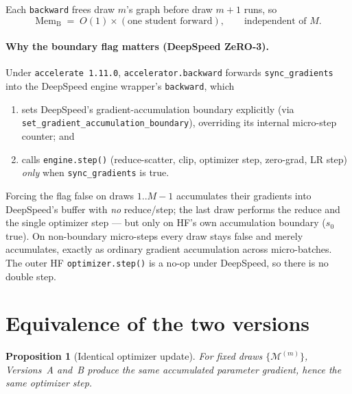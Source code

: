 \documentclass{article}
\newcommand{\Mset}{\mathcal M}
\theoremstyle{plain}
\newtheorem{proposition}{Proposition}
\theoremstyle{remark}
\begin{document}
Each \texttt{backward} frees draw $m$'s graph before draw $m{+}1$ runs, so
\begin{equation}
  \text{Mem}_{\text{B}} \;=\; O(1)\times(\text{one student forward}),
  \qquad\text{independent of } M.
\end{equation}

\paragraph{Why the boundary flag matters (DeepSpeed ZeRO-3).}
Under \texttt{accelerate 1.11.0}, \texttt{accelerator.backward} forwards
\texttt{sync\_gradients} into the DeepSpeed engine wrapper's \texttt{backward},
which
\begin{enumerate}\itemsep2pt
  \item sets DeepSpeed's gradient-accumulation boundary explicitly
        (via \texttt{set\_gradient\_}\allowbreak\texttt{accumulation\_}\allowbreak\texttt{boundary}),
        overriding its internal micro-step counter; and
  \item calls \texttt{engine.step()} (reduce-scatter, clip, optimizer step, zero-grad,
        LR step) \emph{only} when \texttt{sync\_gradients} is true.
\end{enumerate}
Forcing the flag false on draws $1..M{-}1$ accumulates their gradients into
DeepSpeed's buffer with \emph{no} reduce/step; the last draw performs the reduce
and the single optimizer step --- but only on HF's own accumulation boundary
($s_0$ true). On non-boundary micro-steps every draw stays false and merely
accumulates, exactly as ordinary gradient accumulation across micro-batches. The
outer HF \texttt{optimizer.step()} is a no-op under DeepSpeed, so there is no
double step.

\section{Equivalence of the two versions}

\begin{proposition}[Identical optimizer update]
\label{prop:equiv}
For fixed draws $\{\Mset^{(m)}\}$, Versions~A and~B produce the same accumulated
parameter gradient, hence the same optimizer step.
\end{proposition}
\end{document}
